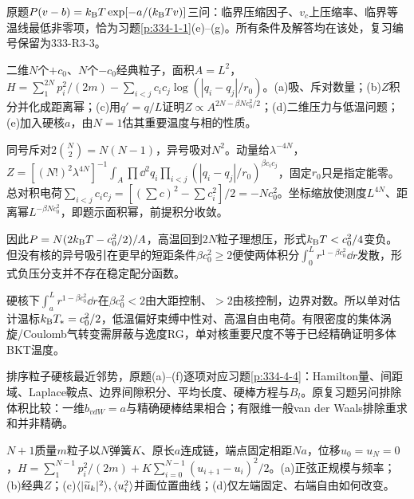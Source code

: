 原题$P(v-b)=k_{\mathrm B} T\exp[-a/(k_{\mathrm B} Tv)]$三问：临界压缩因子、$v_c$上压缩率、临界等温线最低非零项，恰为习题\ref{p:334-1-1}(e)--(g)。所有条件及解答均在该处，复习编号保留为333-R3-3。
\begin{exercise}[原题4(a)--(e)]\label{r:333-3-4}
二维$N$个$+c_0$、$N$个$-c_0$经典粒子，面积$A=L^2$，$H=\sum_{1}^{2N}p_i^2/(2m)-\sum_{i<j}c_ic_j\log(|q_i-q_j|/r_0)$。(a)吸、斥对数量；(b)$Z$积分并化成距离幂；(c)用$q'=q/L$证明$Z\propto A^{2N-\beta Nc_0^2/2}$；(d)二维压力与低温问题；(e)加入硬核$a$，由$N=1$估其重要温度与相的性质。
\end{exercise}
\begin{solution}
同号斥对$2\binom N2=N(N-1)$，异号吸对$N^2$。动量给$\lambda^{-4N}$，$Z=[(N!)^2\lambda^{4N}]^{-1}\int_A\prod\dd^2q_i\prod_{i<j}(|q_i-q_j|/r_0)^{\beta c_ic_j}$，固定$r_0$只是指定能零。总对积电荷$\sum_{i<j}c_ic_j=[(\sum c)^2-\sum c_i^2]/2=-Nc_0^2$。坐标缩放使测度$L^{4N}$、距离幂$L^{-\beta Nc_0^2}$，即题示面积幂，前提积分收敛。

因此$P=N(2k_{\mathrm B} T-c_0^2/2)/A$，高温回到$2N$粒子理想压，形式$k_{\mathrm B} T<c_0^2/4$变负。但没有核的异号吸引在更早的短距条件$\beta c_0^2\ge2$便使两体积分$\int_0^Lr^{1-\beta c_0^2}\dd r$发散，形式负压分支并不存在稳定配分函数。

硬核下$\int_a^Lr^{1-\beta c_0^2}\dd r$在$\beta c_0^2<2$由大距控制、$>2$由核控制，边界对数。所以单对估计温标$k_{\mathrm B} T_*=c_0^2/2$，低温偏好束缚中性对、高温自由电荷。有限密度的集体涡旋/Coulomb气转变需屏蔽与逸度RG，单对核重要尺度不等于已经精确证明多体BKT温度。
\end{solution}
排序粒子硬核最近邻势，原题(a)--(f)逐项对应习题\ref{p:334-4-4}：Hamilton量、间距域、Laplace鞍点、边界间隙积分、平均长度、硬棒方程与$B_l$。原复习题另问排除体积比较：一维$b_{vdW}=a$与精确硬棒结果相合；有限维一般van der Waals排除重求和并非精确。
\begin{exercise}[原题6(a)--(d)]\label{r:333-3-6}
$N+1$质量$m$粒子以$N$弹簧$K$、原长$a$连成链，端点固定相距$Na$，位移$u_0=u_N=0$，$H=\sum_{1}^{N-1}p_i^2/(2m)+K\sum_{i=0}^{N-1}(u_{i+1}-u_i)^2/2$。(a)正弦正规模与频率；(b)经典$Z$；(c)$\langle |\widetilde u_k|^2\rangle,\langle u_i^2\rangle$并画位置曲线；(d)仅左端固定、右端自由如何改变。
\end{exercise}
